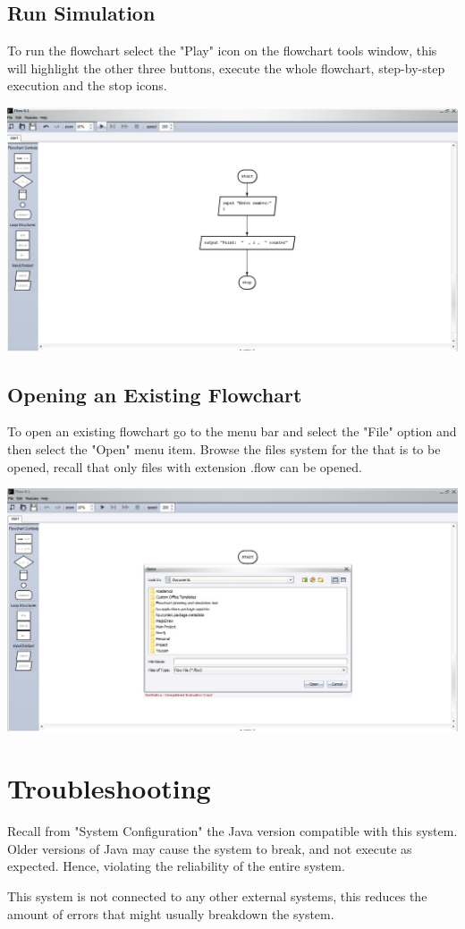 \documentclass[11pt,a4paper,titlepage]{article}
\begin{document}
	\subsection{Run Simulation}
	To run the flowchart select the "Play" icon on the flowchart tools window, this will highlight the other three buttons, execute the whole flowchart, step-by-step execution and the stop icons.
	
	\includegraphics[width=14cm]{images/runSimulator.jpg}
	
		
	\subsection{Opening an Existing Flowchart}
	
	To open an existing flowchart go to the menu bar and select the "File" option and then select the "Open" menu item. Browse the files system for the that is to be opened, recall that only files with extension .flow can be opened. \newline
	
	\includegraphics[width=14cm]{images/openFlowchart.jpg}
	
\section{Troubleshooting}

Recall from "System Configuration" the Java version compatible with this system. Older versions of Java may cause the system to break, and not execute as expected. Hence, violating the reliability of the entire system.

This system is not connected to any other external systems, this reduces the amount of errors that might usually breakdown the system.
\end{document}
